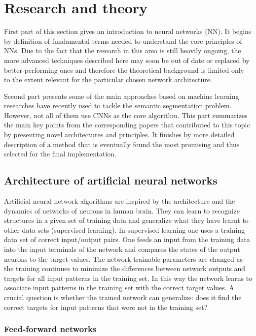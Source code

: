\chapter{Research and theory}
\label{research}
First part of this section gives an introduction to neural networks (NN). It begins by definition of fundamental terms needed to understand the core principles of NNs. Due to the fact that the research in this area is still heavily ongoing, the more advanced techniques described here may soon be out of date or replaced by better-performing ones and therefore the theoretical background is limited only to the extent relevant for the particular chosen network architecture. 

Second part presents some of the main approaches based on machine learning researches have recently used to tackle the semantic segmentation problem. However, not all of them use CNNs as the core algorithm. This part summarizes the main key points from the corresponding papers that contributed to this topic by presenting novel architectures and principles. It finishes by more detailed description of a method that is eventually found the most promising and thus selected for the final implementation.

\section{Architecture of artificial neural networks}
Artificial neural network algorithms are inspired by the architecture and the dynamics
of networks of neurons in human brain. They can learn to recognize structures in a given set of training data and generalize what they have learnt to other data sets (supervised learning). In supervised learning one uses a training data set of correct input/output pairs. One feeds an input from the training data into the input terminals of the network and compares the states of the output neurons to the target values. The network trainable parameters are changed as the training continues to minimize the differences between network outputs and targets for all input patterns in the training set. In this way the network learns to associate input patterns in the training set with the correct target values. A crucial question is whether the trained network can generalize: does it find the correct targets for input patterns that were not in the training set? 

\subsection{Feed-forward networks}

